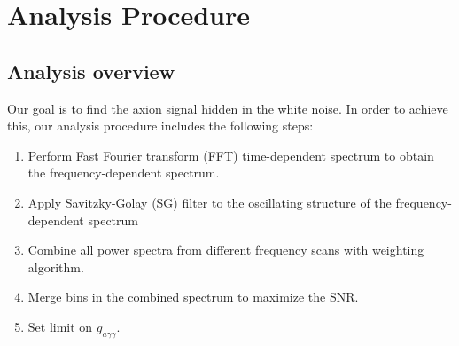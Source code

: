 \section{Analysis Procedure} \label{sec:ana}
    \subsection{Analysis overview}
Our goal is to find the axion signal hidden in the white noise. In order to achieve this, our analysis procedure includes the following steps:
    \begin{enumerate}
        \item Perform Fast Fourier transform (FFT) time-dependent spectrum to obtain the frequency-dependent spectrum.
        \item Apply Savitzky-Golay (SG) filter to the oscillating structure of the frequency-dependent spectrum
        \item Combine all power spectra from different frequency scans with weighting algorithm.
        \item Merge bins in the combined spectrum to maximize the SNR.
        \item Set limit on ${g_{a\gamma \gamma}}$.
    \end{enumerate}

